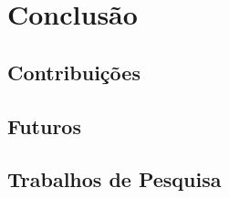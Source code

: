 \chapter{Conclusão}
\lipsum[1-4]

\section{Contribuições}
\lipsum[1-4]

\section{Futuros}
\lipsum[1-4]

\section{Trabalhos de Pesquisa}
\lipsum[1-4]
